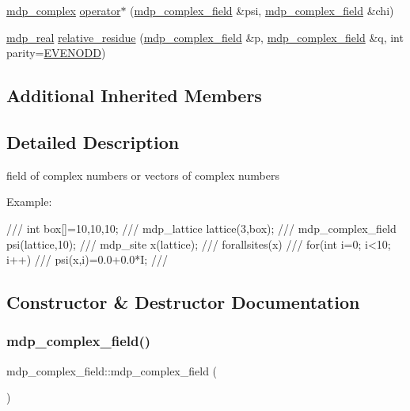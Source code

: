 \begin{DoxyCompactItemize}
\item 
\hyperlink{classmdp__complex}{mdp\+\_\+complex} \hyperlink{classmdp__complex__field_a11f474ce79caba1227bcf83b2be3424c}{operator$\ast$} (\hyperlink{classmdp__complex__field}{mdp\+\_\+complex\+\_\+field} \&psi, \hyperlink{classmdp__complex__field}{mdp\+\_\+complex\+\_\+field} \&chi)
\item 
\hyperlink{mdp__global__vars_8h_a69d96b74c791e0bbdb888b3913a69450}{mdp\+\_\+real} \hyperlink{classmdp__complex__field_a0936375b6edd3f01728d16ac38c76c32}{relative\+\_\+residue} (\hyperlink{classmdp__complex__field}{mdp\+\_\+complex\+\_\+field} \&p, \hyperlink{classmdp__complex__field}{mdp\+\_\+complex\+\_\+field} \&q, int parity=\hyperlink{mdp__global__vars_8h_a4c9de81f2de5a74b588107b6c0afb9ee}{E\+V\+E\+N\+O\+DD})
\end{DoxyCompactItemize}
\subsection*{Additional Inherited Members}


\subsection{Detailed Description}
field of complex numbers or vectors of complex numbers 

Example\+: \begin{DoxyVerb}///    int box[]={10,10,10};
///    mdp_lattice lattice(3,box);
///    mdp_complex_field psi(lattice,10);
///    mdp_site x(lattice);
///    forallsites(x)
///      for(int i=0; i<10; i++)
///         psi(x,i)=0.0+0.0*I;
/// \end{DoxyVerb}
 

\subsection{Constructor \& Destructor Documentation}
\mbox{\label{classmdp__complex__field_aa629a99588ce79fe33fafb6db4f8226a}} 
\subsubsection{\texorpdfstring{mdp\+\_\+complex\+\_\+field()}{mdp\_complex\_field()}\hspace{0.1cm}{\footnotesize\ttfamily [1/3]}}
{\footnotesize\ttfamily mdp\+\_\+complex\+\_\+field\+::mdp\+\_\+complex\+\_\+field (\begin{DoxyParamCaption}{ }\end{DoxyParamCaption})\hspace{0.3cm}{\ttfamily [inline]}}


